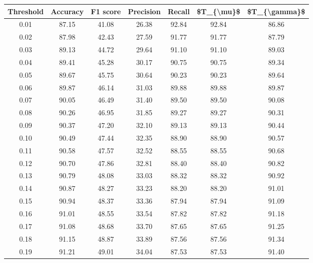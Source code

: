 \begin{tabular}{|c|c|c|c|c|c|c|}
\hline
 Threshold &  Accuracy &  F1 score &  Precision &  Recall &  \$T\_\{\textbackslash mu\}\$ &  \$T\_\{\textbackslash gamma\}\$ \\
\hline
      0.01 &     87.15 &     41.08 &      26.38 &   92.84 &      92.84 &         86.86 \\
      0.02 &     87.98 &     42.43 &      27.59 &   91.77 &      91.77 &         87.79 \\
      0.03 &     89.13 &     44.72 &      29.64 &   91.10 &      91.10 &         89.03 \\
      0.04 &     89.41 &     45.28 &      30.17 &   90.75 &      90.75 &         89.34 \\
      0.05 &     89.67 &     45.75 &      30.64 &   90.23 &      90.23 &         89.64 \\
      0.06 &     89.87 &     46.14 &      31.03 &   89.88 &      89.88 &         89.87 \\
      0.07 &     90.05 &     46.49 &      31.40 &   89.50 &      89.50 &         90.08 \\
      0.08 &     90.26 &     46.95 &      31.85 &   89.27 &      89.27 &         90.31 \\
      0.09 &     90.37 &     47.20 &      32.10 &   89.13 &      89.13 &         90.44 \\
      0.10 &     90.49 &     47.44 &      32.35 &   88.90 &      88.90 &         90.57 \\
      0.11 &     90.58 &     47.57 &      32.52 &   88.55 &      88.55 &         90.68 \\
      0.12 &     90.70 &     47.86 &      32.81 &   88.40 &      88.40 &         90.82 \\
      0.13 &     90.79 &     48.08 &      33.03 &   88.32 &      88.32 &         90.92 \\
      0.14 &     90.87 &     48.27 &      33.23 &   88.20 &      88.20 &         91.01 \\
      0.15 &     90.94 &     48.37 &      33.36 &   87.94 &      87.94 &         91.09 \\
      0.16 &     91.01 &     48.55 &      33.54 &   87.82 &      87.82 &         91.18 \\
      0.17 &     91.08 &     48.68 &      33.70 &   87.65 &      87.65 &         91.25 \\
      0.18 &     91.15 &     48.87 &      33.89 &   87.56 &      87.56 &         91.34 \\
      0.19 &     91.21 &     49.01 &      34.04 &   87.53 &      87.53 &         91.40 \\

\end{tabular}
